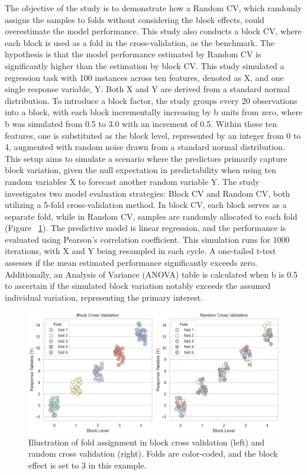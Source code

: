 The objective of the study is to demonstrate how a Random CV, which randomly assigns the samples to folds without considering the block effects, could overestimate the model performance. This study also conducts a block CV, where each block is used as a fold in the cross-validation, as the benchmark. The hypothesis is that the model performance estimated by Random CV is significantly higher than the estimation by block CV. This study simulated a regression task with 100 instances across ten features, denoted as X, and one single response variable, Y. Both X and Y are derived from a standard normal distribution. To introduce a block factor, the study groups every 20 observations into a block, with each block incrementally increasing by b units from zero, where b was simulated from 0.5 to 3.0 with an increment of 0.5. Within these ten features, one is substituted as the block level, represented by an integer from 0 to 4, augmented with random noise drawn from a standard normal distribution. This setup aims to simulate a scenario where the predictors primarily capture block variation, given the null expectation in predictability when using ten random variables X to forecast another random variable Y.
The study investigates two model evaluation strategies: Block CV and Random CV, both utilizing a 5-fold cross-validation method. In block CV, each block serves as a separate fold, while in Random CV, samples are randomly allocated to each fold (Figure ~\ref{fig:s3_block}). The predictive model is linear regression, and the performance is evaluated using Pearson's correlation coefficient. This simulation runs for 1000 iterations, with X and Y being resampled in each cycle. A one-tailed t-test assesses if the mean estimated performance significantly exceeds zero. Additionally, an Analysis of Variance (ANOVA) table is calculated when b is 0.5 to ascertain if the simulated block variation notably exceeds the assumed individual variation, representing the primary interest.

\begin{figure}[h]
    \centering
    \includegraphics[width=1\textwidth]{fig_s3_block.jpg}
    \caption{Illustration of fold assignment in block cross validation (left) and random cross validation (right). Folds are color-coded, and the block effect is set to 3 in this example.}
    \label{fig:s3_block}
\end{figure}

